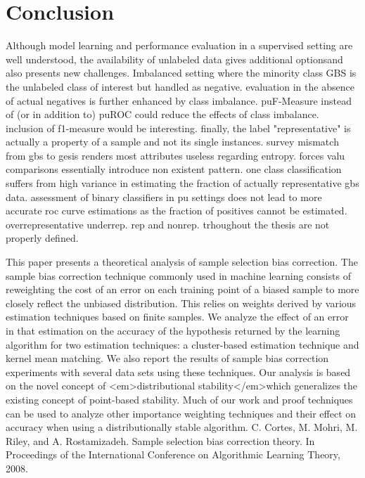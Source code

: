\chapter{Conclusion}\label{Sec:Conclusion}

Although model learning and performance evaluation in a supervised setting are well understood, the availability of unlabeled data gives additional optionsand also presents new challenges.
Imbalanced setting where the minority class GBS is the unlabeled class of interest but handled as negative. evaluation in the absence of actual negatives is further enhanced by class imbalance. puF-Measure instead of (or in addition to) puROC could reduce the effects of class imbalance. inclusion of f1-measure would be interesting. finally, the label "representative" is actually a property of a sample and not its single instances. survey mismatch from gbs to gesis renders most attributes useless regarding entropy. forces valu comparisons essentially introduce non existent pattern. one class classification suffers from high variance in estimating the fraction of actually representative gbs data. assessment of binary classifiers in pu settings does not lead to more accurate roc curve estimations as the fraction of positives cannot be estimated. overrepresentative underrep. rep and nonrep. trhoughout the thesis are not properly defined.

This paper presents a theoretical analysis of sample selection bias correction. The sample bias correction technique commonly used in machine learning consists of reweighting the cost of an error on each training point of a biased sample to more closely reflect the unbiased distribution. This relies on weights derived by various estimation techniques based on finite samples. We analyze the effect of an error in that estimation on the accuracy of the hypothesis returned by the learning algorithm for two estimation techniques: a cluster-based estimation technique and kernel mean matching. We also report the results of sample bias correction experiments with several data sets using these techniques. Our analysis is based on the novel concept of <em>distributional stability</em>which generalizes the existing concept of point-based stability. Much of our work and proof techniques can be used to analyze other importance weighting techniques and their effect on accuracy when using a distributionally stable algorithm. C. Cortes, M. Mohri, M. Riley, and A. Rostamizadeh. Sample selection bias correction theory. In Proceedings of the International Conference on Algorithmic Learning Theory, 2008.